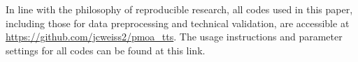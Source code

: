 \label{ch05:sec:data_availability}
In line with the philosophy of reproducible research, all codes used in this paper, including those for data preprocessing and technical validation, are accessible at \url{https://github.com/jcweiss2/pmoa_tts}.
The usage instructions and parameter settings for all codes can be found at this link.

